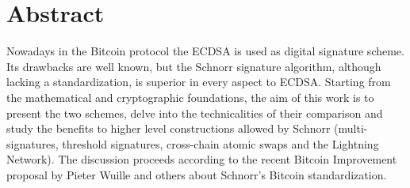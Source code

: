 \chapter{Abstract}
\label{chpr:abstract}
Nowadays in the Bitcoin protocol the ECDSA is used as digital signature scheme. Its drawbacks are well known, but the Schnorr signature algorithm, although lacking a standardization, is superior in every aspect to ECDSA. Starting from the mathematical and cryptographic foundations, the aim of this work is to present the two schemes, delve into the technicalities of their comparison and study the benefits to higher level constructions allowed by Schnorr (multi-signatures, threshold signatures, cross-chain atomic swaps and the Lightning Network). The discussion proceeds according to the recent Bitcoin Improvement proposal by Pieter Wuille and others about Schnorr's Bitcoin standardization.